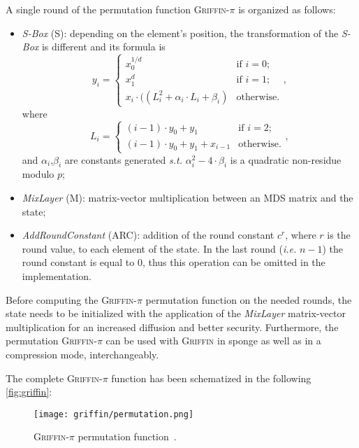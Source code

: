 \documentclass[12pt, a4paper]{report}
\begin{document}
A single round of the permutation function \textsc{Griffin-$\pi$} is organized as follows:
\begin{itemize}
  \item \textit{S-Box} (S): depending on the element's position, the transformation of the \textit{S-Box} is different and its formula is
  \begin{equation}
    y_i = \left\{
      \begin{array}{ll}
        x_0^{1/d} & \text{if } i = 0; \\
        x_1^{d} & \text{if } i = 1; \\
        x_i \cdot ((L_i^2 + \alpha_i \cdot L_i + \beta_i) & \text{otherwise}.
      \end{array}
    \right.,
    \label{eq:griffinsbox}
  \end{equation}
  where
  \begin{equation}
    L_i = \left\{
      \begin{array}{ll}
        (i-1) \cdot y_0 + y_1 & \text{if } i = 2; \\
        (i-1) \cdot y_0 + y_1 + x_{i-1} & \text{otherwise}.
      \end{array}
    \right.,
    \label{eq:griffinli}
  \end{equation}
  and $\alpha_i$,$\beta_i$ are constants generated \textsl{s.t.} $\alpha_i^2 - 4 \cdot \beta_i$ is a quadratic non-residue modulo $p$;
  \item \textit{MixLayer} (M): matrix-vector multiplication between an MDS matrix and the state;
  \item \textit{AddRoundConstant} (ARC): addition of the round constant $c^r$, where $r$ is the round value, to each element of the state. In the last round (\textsl{i.e.} $n-1$) the round constant is equal to 0, thus this operation can be omitted in the implementation.
\end{itemize}

Before computing the \textsc{Griffin-$\pi$} permutation function on the needed rounds, the state needs to be initialized with the application of the \textit{MixLayer} matrix-vector multiplication for an increased diffusion and better security.
Furthermore, the permutation \textsc{Griffin-$\pi$} can be used with \textsc{Griffin} in sponge as well as in a compression mode, interchangeably. 

The complete \textsc{Griffin-$\pi$} function has been schematized in the following \autoref{fig:griffin}:
\begin{figure}[H]
  \begin{center}
    \texttt{[image: griffin/permutation.png]}
  \end{center}
  \caption{\textsc{Griffin-$\pi$} permutation function~\cite[Fig.~2]{griffin}.}\label{fig:griffin}
\end{figure}
\end{document}
